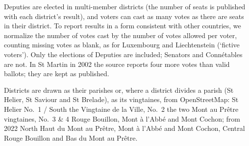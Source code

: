 Deputies are elected in multi-member districts (the number of seats is
published with each district's result), and voters can cast as many votes as
there are seats in their district.  To report results in a form consistent
with other countries, we normalize the number of votes cast by the number of
votes allowed per voter, counting missing votes as blank, as for Luxembourg
and Liechtenstein (`fictive voters').  Only the elections of Deputies are
included; Senators and Connétables are not.  In St Martin in 2002 the source
reports four more votes than valid ballots; they are kept as published.

Districts are drawn as their parishes or, where a district divides a parish
(St Helier, St Saviour and St Brelade), as its vingtaines, from
OpenStreetMap: St Helier No.~1 / South the Vingtaine de la Ville, No.~2 the
two Mont au Prêtre vingtaines, No.~3 \& 4 Rouge Bouillon, Mont à l'Abbé and
Mont Cochon; from 2022 North Haut du Mont au Prêtre, Mont à l'Abbé and Mont
Cochon, Central Rouge Bouillon and Bas du Mont au Prêtre.
